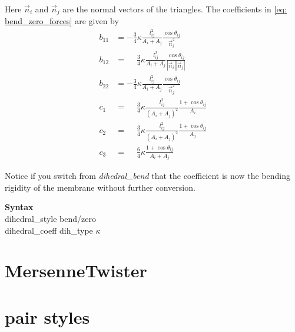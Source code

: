 Here $\vec{n}_i$ and $\vec{n}_j$ are the normal vectors of the triangles. The coefficients in \eqref{eq: bend_zero_forces} are given by
\begin{align}
  b_{11} &= -\frac 34 \kappa \frac{l_{ij}^2}{A_i + A_j} \frac{\cos{\theta_{ij}}}{\vec{n}_i^2} \nonumber \\
  b_{12} &= \phantom{-}\frac 34 \kappa \frac{l_{ij}^2}{A_i + A_j} \frac{\cos{\theta_{ij}}}{\left\lvert \vec{n}_i \right\rvert \left\lvert \vec{n}_j \right\rvert} \nonumber \\
  b_{22} &= -\frac 34 \kappa \frac{l_{ij}^2}{A_i + A_j} \frac{\cos{\theta_{ij}}}{\vec{n}_j^2} \nonumber \\
  c_{1} &= \phantom{-}\frac 34 \kappa \frac{l_{ij}^2}{\left(A_i + A_j\right)^2} \frac{1+\cos{\theta_{ij}}}{A_i} \nonumber \\
  c_{2} &= \phantom{-}\frac 34 \kappa \frac{l_{ij}^2}{\left(A_i + A_j\right)^2} \frac{1+\cos{\theta_{ij}}}{A_j} \nonumber \\
  c_{3} &= \phantom{-}\frac 64 \kappa \frac{1+\cos{\theta_{ij}}}{A_i + A_j}
\end{align}

Notice if you switch from \emph{dihedral\_bend} that the coefficient is now the bending rigidity of the membrane without further conversion.

\textbf{Syntax}\\
dihedral\_style \quad bend/zero\\ 
dihedral\_coeff \quad dih\_type $\kappa$




\section{MersenneTwister}

\section{pair styles}

